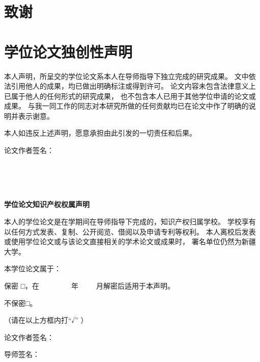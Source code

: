 \chapter[致谢]{致\quad 谢}

\chapter[学位论文独创性声明及学位论文知识产权权属声明]{学位论文独创性声明}
\linespread{1.5}\vspace*{2ex}
    本人声明，所呈交的学位论文系本人在导师指导下独立完成的研究成果。
    文中依法引用他人的成果，均已做出明确标注或得到许可。
    论文内容未包含法律意义上已属于他人的任何形式的研究成果，
    也不包含本人已用于其他学位申请的论文或成果。
    与我一同工作的同志对本研究所做的任何贡献均已在论文中作了明确的说明并表示谢意。

    本人如违反上述声明，愿意承担由此引发的一切责任和后果。

    \linespread{2.0}
    \vspace*{2ex}
    {{论文作者签名：}\hspace*{12em}{日期：~~~~~~年~~~~~~月~~~~~~日}}

    ~\\
    ~\\

    ~\\

    \centerline{\bfseries\sffamily\fontsize{16pt}{\baselineskip}\selectfont 学位论文知识产权权属声明}
    \linespread{1.5}
    \vspace*{2ex}

    本人的学位论文是在学期间在导师指导下完成的，知识产权归属学校。
    学校享有以任何方式发表、复制、公开阅览、借阅以及申请专利等权利。
    本人离校后发表或使用学位论文或与该论文直接相关的学术论文或成果时，
    署名单位仍然为新疆大学。

    本学位论文属于：

    保\quad 密 □，在~~~~~~~~~年~~~~~月解密后适用于本声明。

    不保密□。

    （请在以上方框内打“√” ）

    {{论文作者签名：} \hspace*{12em}{日期：~~~~~~年~~~~~~月~~~~~~日}}

    {{导师签名：}\hspace*{14.25em}{日期：~~~~~~年~~~~~~月~~~~~~日}}
    \cleardoublepage[plain]%

